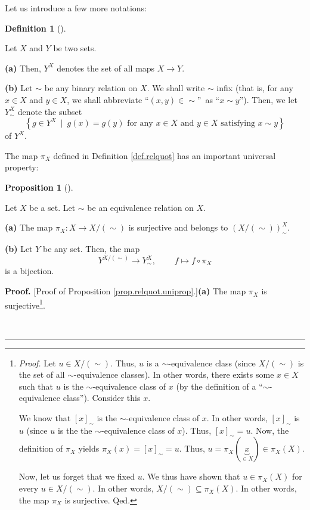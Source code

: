 \documentclass[numbers=enddot,12pt,final,onecolumn,notitlepage]{scrartcl}%
\theoremstyle{definition}
\newtheorem{prop}[theo]{Proposition}
\newenvironment{proposition}[1][]
{\begin{prop}[#1]\begin{leftbar}}
{\end{leftbar}\end{prop}}
\newtheorem{defi}[theo]{Definition}
\newenvironment{definition}[1][]
{\begin{defi}[#1]\begin{leftbar}}
{\end{leftbar}\end{defi}}
\newenvironment{proof}[1][Proof]{\noindent\textbf{#1.} }{\ \rule{0.5em}{0.5em}}
\newenvironment{verlong}{}{}
\begin{document}
\begin{verlong}
Let us introduce a few more notations:

\begin{definition}
\label{def.relquot.maps}Let $X$ and $Y$ be two sets.

\textbf{(a)} Then, $Y^{X}$ denotes the set of all maps $X\rightarrow Y$.

\textbf{(b)} Let $\sim$ be any binary relation on $X$. We shall write $\sim$
infix (that is, for any $x\in X$ and $y\in X$, we shall abbreviate
\textquotedblleft$\left(  x,y\right)  \in\sim$\textquotedblright\ as
\textquotedblleft$x\sim y$\textquotedblright). Then, we let $Y_{\sim}^{X}$
denote the subset%
\[
\left\{  g\in Y^{X}\ \mid\ g\left(  x\right)  =g\left(  y\right)  \text{ for
any }x\in X\text{ and }y\in X\text{ satisfying }x\sim y\right\}
\]
of $Y^{X}$.
\end{definition}

The map $\pi_{X}$ defined in Definition \ref{def.relquot} has an important
universal property:

\begin{proposition}
\label{prop.relquot.uniprop}Let $X$ be a set. Let $\sim$ be an equivalence
relation on $X$.

\textbf{(a)} The map $\pi_{X}:X\rightarrow X/\left(  \sim\right)  $ is
surjective and belongs to $\left(  X/\left(  \sim\right)  \right)  _{\sim}%
^{X}$.

\textbf{(b)} Let $Y$ be any set. Then, the map%
\[
Y^{X/\left(  \sim\right)  }\rightarrow Y_{\sim}^{X}%
,\ \ \ \ \ \ \ \ \ \ f\mapsto f\circ\pi_{X}%
\]
is a bijection.
\end{proposition}

\begin{proof}
[Proof of Proposition \ref{prop.relquot.uniprop}.]\textbf{(a)} The map
$\pi_{X}$ is surjective\footnote{\textit{Proof.} Let $u\in X/\left(
\sim\right)  $. Thus, $u$ is a $\sim$-equivalence class (since $X/\left(
\sim\right)  $ is the set of all $\sim$-equivalence classes). In other words,
there exists some $x\in X$ such that $u$ is the $\sim$-equivalence class of
$x$ (by the definition of a \textquotedblleft$\sim$-equivalence
class\textquotedblright). Consider this $x$.
\par
We know that $\left[  x\right]  _{\sim}$ is the $\sim$-equivalence class of
$x$. In other words, $\left[  x\right]  _{\sim}$ is $u$ (since $u$ is the the
$\sim$-equivalence class of $x$). Thus, $\left[  x\right]  _{\sim}=u$. Now,
the definition of $\pi_{X}$ yields $\pi_{X}\left(  x\right)  =\left[
x\right]  _{\sim}=u$. Thus, $u=\pi_{X}\left(  \underbrace{x}_{\in X}\right)
\in\pi_{X}\left(  X\right)  $.
\par
Now, let us forget that we fixed $u$. We thus have shown that $u\in\pi
_{X}\left(  X\right)  $ for every $u\in X/\left(  \sim\right)  $. In other
words, $X/\left(  \sim\right)  \subseteq\pi_{X}\left(  X\right)  $. In other
words, the map $\pi_{X}$ is surjective. Qed.}.


\end{proof}
\end{verlong}
\end{document}
